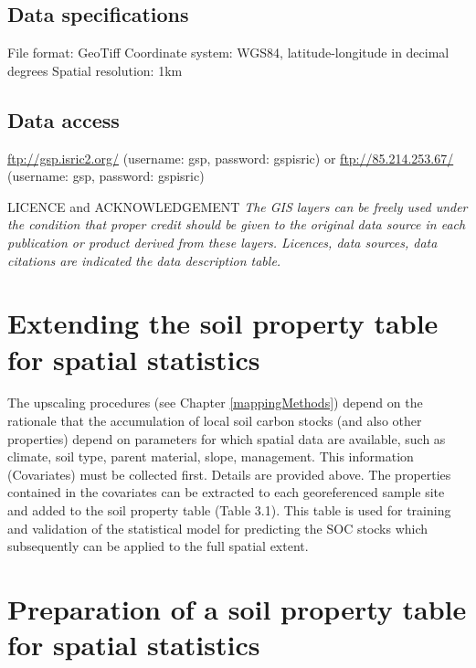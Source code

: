 \documentclass[10pt,b5paper,]{book}
\theoremstyle{definition}
\theoremstyle{definition}
\theoremstyle{definition}
\theoremstyle{remark}
\begin{document}
\hypertarget{data-specifications}{%
\subsection{Data specifications}\label{data-specifications}}

File format: GeoTiff Coordinate system: WGS84, latitude-longitude in
decimal degrees Spatial resolution: 1km

\hypertarget{data-access}{%
\subsection{Data access}\label{data-access}}

\url{ftp://gsp.isric2.org/} (username: gsp, password: gspisric) or
\url{ftp://85.214.253.67/} (username: gsp, password: gspisric)

LICENCE and ACKNOWLEDGEMENT \emph{The GIS layers can be freely used
under the condition that proper credit should be given to the original
data source in each publication or product derived from these layers.
Licences, data sources, data citations are indicated the data
description table.}

\hypertarget{extending-the-soil-property-table-for-spatial-statistics}{%
\section{Extending the soil property table for spatial
statistics}\label{extending-the-soil-property-table-for-spatial-statistics}}

The upscaling procedures (see Chapter \ref{mappingMethods}) depend on
the rationale that the accumulation of local soil carbon stocks (and
also other properties) depend on parameters for which spatial data are
available, such as climate, soil type, parent material, slope,
management. This information (Covariates) must be collected first.
Details are provided above. The properties contained in the covariates
can be extracted to each georeferenced sample site and added to the soil
property table (Table 3.1). This table is used for training and
validation of the statistical model for predicting the SOC stocks which
subsequently can be applied to the full spatial extent.

\hypertarget{preparation-of-a-soil-property-table-for-spatial-statistics}{%
\section{Preparation of a soil property table for spatial
statistics}\label{preparation-of-a-soil-property-table-for-spatial-statistics}}
\end{document}
